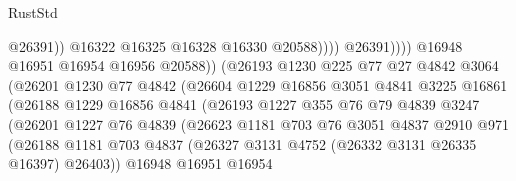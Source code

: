 \begin{lexlean}{RustStd}
\begin{coremodule}
                                                  @26391))
                                              @16322
                                              @16325
                                              @16328
                                              @16330
                                              @20588))))
                                      @26391))))
                              @16948
                              @16951
                              @16954
                              @16956
                              @20588))
                          (@26193
                            @1230
                            @225
                            @77
                            @27
                            @4842
                            @3064
                            (@26201
                              @1230
                              @77
                              @4842
                              (@26604
                                @1229
                                @16856
                                @3051
                                @4841
                                @3225
                                @16861
                                (@26188
                                  @1229
                                  @16856
                                  @4841
                                  (@26193
                                    @1227
                                    @355
                                    @76
                                    @79
                                    @4839
                                    @3247
                                    (@26201
                                      @1227
                                      @76
                                      @4839
                                      (@26623
                                        @1181
                                        @703
                                        @76
                                        @3051
                                        @4837
                                        @2910
                                        @971
                                        (@26188
                                          @1181
                                          @703
                                          @4837
                                          (@26327 @3131 @4752 (@26332 @3131 @26335 @16397) @26403))
                                        @16948
                                        @16951
                                        @16954

\end{coremodule}
\end{lexlean}
